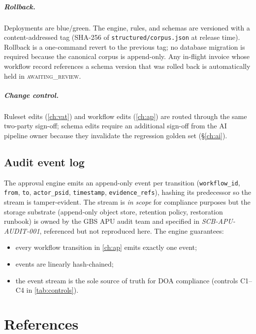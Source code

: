 \documentclass[11pt,a4paper,twoside]{report}
\begin{document}
\paragraph{Rollback.} Deployments are blue/green. The engine, rules,
and schemas are versioned with a content-addressed tag (SHA-256 of
\texttt{structured/corpus.json} at release time). Rollback is a
one-command revert to the previous tag; no database migration is
required because the canonical corpus is append-only. Any in-flight
invoice whose workflow record references a schema version that was
rolled back is automatically held in \textsc{awaiting\_review}.

\paragraph{Change control.} Ruleset edits (\cref{ch:vat}) and
workflow edits (\cref{ch:ap}) are routed through the same two-party
sign-off; schema edits require an additional sign-off from the AI
pipeline owner because they invalidate the regression golden set
(\S\ref{ch:ai}).

\section{Audit event log}

The approval engine emits an append-only event per transition
(\texttt{workflow\_id}, \texttt{from}, \texttt{to},
\texttt{actor\_psid}, \texttt{timestamp}, \texttt{evidence\_refs}),
hashing its predecessor so the stream is tamper-evident. The stream
is \emph{in scope} for compliance purposes but the storage substrate
(append-only object store, retention policy, restoration runbook) is
owned by the GBS APU audit team and specified in
\emph{SCB-APU-AUDIT-001}, referenced but not reproduced here. The
engine guarantees:

\begin{itemize}
\item every workflow transition in \cref{ch:ap} emits exactly one
event;
\item events are linearly hash-chained;
\item the event stream is the sole source of truth for DOA
compliance (controls C1--C4 in \cref{tab:controls}).
\end{itemize}
\chapter{References}\label{ch:references}
\end{document}
